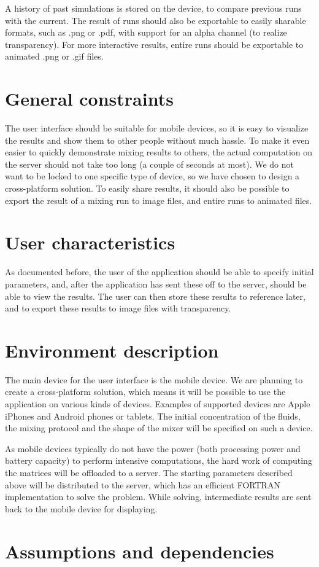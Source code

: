 A history of past simulations is stored on the device, to compare previous runs with the current. The result of runs should also be exportable to easily sharable formats, such as .png or .pdf, with support for an alpha channel (to realize transparency). For more interactive results, entire runs should be exportable to animated .png or .gif files.

\section{General constraints}
The user interface should be suitable for mobile devices, so it is easy to visualize the results and show them to other people without much hassle. To make it even easier to quickly demonstrate mixing results to others, the actual computation on the server should not take too long (a couple of seconds at most). We do not want to be locked to one specific type of device, so we have chosen to design a cross-platform solution. To easily share results, it should also be possible to export the result of a mixing run to image files, and entire runs to animated files.

\section{User characteristics}
As documented before, the user of the application should be able to specify initial parameters, and, after the application has sent these off to the server, should be able to view the results. The user can then store these results to reference later, and to export these results to image files with transparency. 

\section{Environment description}
The main device for the user interface is the mobile device. We are planning to create a cross-platform solution, which means it will be possible to use the application on various kinds of devices. Examples of supported devices are Apple iPhones and Android phones or tablets. The initial concentration of the fluids, the mixing protocol and the shape of the mixer will be specified on such a device.

As mobile devices typically do not have the power (both processing power and battery capacity) to perform intensive computations, the hard work of computing the matrices will be offloaded to a server. The starting parameters described above will be distributed to the server, which has an efficient FORTRAN implementation to solve the problem. While solving, intermediate results are sent back to the mobile device for displaying.

\section{Assumptions and dependencies}
